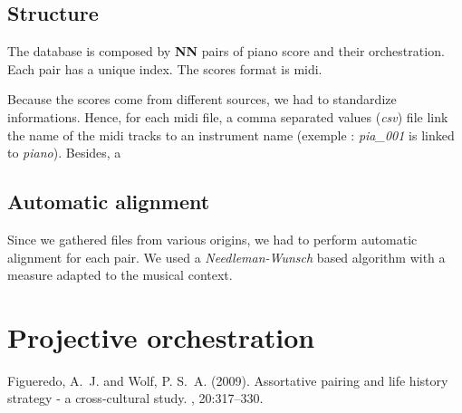 \documentclass[twoside,twocolumn]{article}
\begin{document}
\subsection{Structure}
The database is composed by \textbf{NN} pairs of piano score and their orchestration. 
Each pair has a unique index.
The scores format is midi.

Because the scores come from different sources, we had to standardize  informations. Hence, for each midi file, a comma separated values (\textit{csv}) file link the name of the midi tracks to an instrument name (exemple : \textit{pia_001} is linked to \textit{piano}).
Besides, a 
\subsection{Automatic alignment}
Since we gathered files from various origins, we had to perform automatic alignment for each pair. We used a \textit{Needleman-Wunsch} based algorithm with a measure adapted to the musical context.

\section{Projective orchestration}



\begin{thebibliography}{99} %

Figueredo, A.~J. and Wolf, P. S.~A. (2009).
\newblock Assortative pairing and life history strategy - a cross-cultural
  study.
, 20:317--330.
 
\end{thebibliography}

\end{document}
